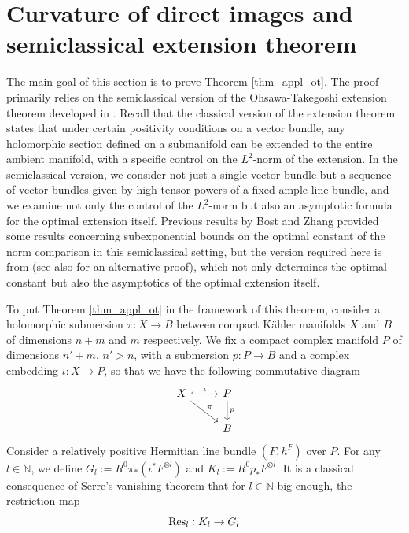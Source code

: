 \documentclass[12pt]{article}
\numberwithin{equation}{section}
\theoremstyle{theorem}
\theoremstyle{definition}
\theoremstyle{remark}
\newcommand{\res}{{\rm{Res}}}
\newcommand{\nat}{\mathbb{N}}
\begin{document}
	\section{Curvature of direct images and semiclassical extension theorem}\label{sect_curv}
	The main goal of this section is to prove Theorem \ref{thm_appl_ot}. 
	The proof primarily relies on the semiclassical version of the Ohsawa-Takegoshi extension theorem developed in \cite{FinOTAs}. 
	Recall that the classical version of the extension theorem \cite{OhsTak1} states that under certain positivity conditions on a vector bundle, any holomorphic section defined on a submanifold can be extended to the entire ambient manifold, with a specific control on the $L^2$-norm of the extension.
	In the semiclassical version, we consider not just a single vector bundle but a sequence of vector bundles given by high tensor powers of a fixed ample line bundle, and we examine not only the control of the $L^2$-norm but also an asymptotic formula for the optimal extension itself. 
	Previous results by Bost \cite{BostDwork} and Zhang \cite{ZhangPosLinBun} provided some results concerning subexponential bounds on the optimal constant of the norm comparison in this semiclassical setting, but the version required here is from \cite{FinOTAs} (see also \cite{FinOTRed} for an alternative proof), which not only determines the optimal constant but also the asymptotics of the optimal extension itself.
	\par 
	To put Theorem \ref{thm_appl_ot} in the framework of this theorem, consider a holomorphic submersion $\pi : X \to B$ between compact Kähler manifolds $X$ and $B$ of dimensions $n + m$ and $m$ respectively.
	We fix  a compact complex manifold $P$ of dimensions $n' + m$, $n' > n$, with a submersion $p : P \to B$ and a complex embedding $\iota : X \to P$, so that we have the following commutative diagram 
	\begin{equation}\label{eq_sh_exct_seq2}
	\begin{tikzcd}
		X \arrow[hookrightarrow]{r}{\iota} \arrow{rd}{\pi} & P \arrow{d}{p} \\
 		& B
	\end{tikzcd}
	\end{equation}
	Consider a relatively positive Hermitian line bundle $(F, h^F)$ over $P$.
	For any $l \in \nat$, we define $G_l := R^0 \pi_* (\iota^* F^{\otimes l})$ and $K_l := R^0 p_* F^{\otimes l}$. 
	It is a classical consequence of Serre's vanishing theorem that for $l \in \nat$ big enough, the restriction map 
	\begin{equation}\label{eq_res_oper}
		\res_l: K_l \to G_l
	\end{equation}
\end{document}
